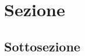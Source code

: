 \section{Sezione}\label{sec:sezione}
\lipsum[6]
\subsection{Sottosezione}\label{ssec:sottosezione}
\lipsum[10]

\lipsum[20]

\lipsum[5]
